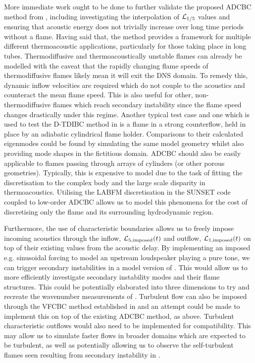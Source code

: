 More immediate work ought to be done to further validate the proposed ADCBC method from , including investigating the interpolation of $\mathcal{L}_{1/5}$ values and ensuring that acoustic energy does not trivially increase over long time periods without a flame. Having said that, the method provides a framework for multiple different thermoacoustic applications, particularly for those taking place in long tubes. Thermodiffusive and thermoacoustically unstable flames can already be modelled with the caveat that the rapidly changing flame speeds of thermodiffusive flames likely mean it will exit the DNS domain. To remedy this, dynamic inflow velocities are required which do not couple to the acoustics and counteract the mean flame speed. This is also useful for other, non-thermodiffusive flames which reach secondary instability since the flame speed changes drastically under this regime. Another typical test case and one which is used to test the D-TDIBC method in \cite{douasbin2018DelayedtimeDomainImpedance} is a flame in a strong counterflow, held in place by an adiabatic cylindrical flame holder. Comparisons to their calculated eigenmodes could be found by simulating the same model geometry whilst also providing mode shapes in the fictitious domain. ADCBC should also be easily applicable to flames passing through arrays of cylinders (or other porous geometries). Typically, this is expensive to model due to the task of fitting the discretisation to the complex body and the large scale disparity in thermoacoustics. Utilising the LABFM discretisation in the SUNSET code coupled to low-order ADCBC allows us to model this phenomena for the cost of discretising only the flame and its surrounding hydrodynamic region.

Furthermore, the use of characteristic boundaries allows us to freely impose incoming acoustics through the inflow, $\mathcal{L}_{5, \mathrm{imposed}}(t)$ and outflow, $\mathcal{L}_{1, \mathrm{imposed}}(t)$ on top of their existing values from the acoustic delay. By implementing an imposed e.g. sinusoidal forcing to model an upstream loudspeaker playing a pure tone, we can trigger secondary instabilities in a model version of \cite{searby1991ParametricAcousticInstability}. This would allow us to more efficiently investigate secondary instability modes and their flame structures. This could be potentially elaborated into three dimensions to try and recreate the wavenumber measurements of \cite{delfin2024DeterminationMethodMarkstein}. Turbulent flow can also be imposed through the VFCBC method established in \cite{guezennec2009AcousticallyNonreflectingReflecting} and an attempt could be made to implement this on top of the existing ADCBC method, as above. Turbulent characteristic outflows would also need to be implemented for compatibility. This may allow us to simulate faster flows in broader domains which are expected to be turbulent, as well as potentially allowing us to observe the self-turbulent flames seen resulting from secondary instability in \cite{searby1992AcousticInstabilityPremixed}.

